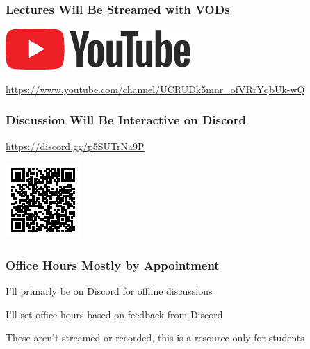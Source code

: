   \begin{frame}
    \frametitle{Lectures Will Be Streamed with VODs}

    \includegraphics[width=7cm]{../../resources/youtube.eps}

    \vspace{1em}

    \url{https://www.youtube.com/channel/UCRUDk5mnr_ofVRrYqbUk-wQ}
  \end{frame}

  \begin{frame}
    \frametitle{Discussion Will Be Interactive on Discord}

    

    \vspace{1em}

    \url{https://discord.gg/p5SUTrNa9P}

    \vspace{1em}

    \includegraphics[scale=2]{discord-link.eps}
  \end{frame}

  \begin{frame}
    \frametitle{Office Hours Mostly by Appointment}

    I'll primarly be on Discord for offline discussions

    \vspace{2em}

    I'll set office hours based on feedback from Discord

    \vspace{2em}

    These aren't streamed or recorded, this is a resource only for students
  \end{frame}

